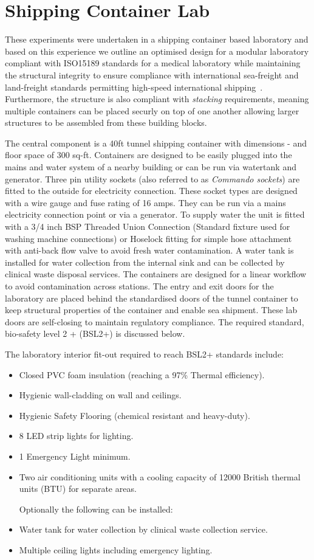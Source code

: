 \documentclass[a4paper,12pt]{article}
\begin{document}
\section{Shipping Container Lab}
These experiments were undertaken in a shipping container based laboratory and based on this experience we outline an optimised design for a modular laboratory compliant with ISO15189 standards for a medical laboratory while maintaining the structural integrity to ensure compliance with international sea-freight and land-freight standards permitting high-speed international shipping~\cite{}. Furthermore, the structure is also compliant with \emph{stacking} requirements, meaning multiple containers can be placed securly on top of one another allowing larger structures to be assembled from these building blocks.

 The central component is a 40ft tunnel shipping container with dimensions - and floor space of 300 sq-ft. Containers are designed to be easily plugged into the mains and water system of a nearby building or can be run via watertank and generator. Three pin utility sockets (also referred to as \emph{Commando sockets}) are fitted to the outside for electricity connection. These socket types are designed with a wire gauge and fuse rating of 16 amps. They can be run via a mains electricity connection point or via a generator. To supply water the unit is fitted with a 3/4 inch BSP Threaded Union Connection (Standard fixture used for washing machine connections) or Hoselock fitting for simple hose attachment with anti-back flow valve to avoid fresh water contamination. A water tank is installed for water collection from the internal sink and can be collected by clinical waste disposal services. The containers are designed for a linear workflow to avoid contamination across stations. The entry and exit doors for the laboratory are placed behind the standardised doors of the tunnel container to keep structural properties of the container and enable sea shipment. These lab doors are self-closing to maintain regulatory compliance. The required standard, bio-safety level 2 + (BSL2+) is discussed below.

The laboratory interior fit-out required to reach BSL2+ standards include:
\begin{itemize}
\item	Closed PVC foam insulation (reaching a 97\% Thermal efficiency).
\item	Hygienic wall-cladding on wall and ceilings.
\item 	Hygienic Safety Flooring (chemical resistant and heavy-duty).
\item 	8 LED strip lights for lighting.
\item	1 Emergency Light minimum.
\item	Two air conditioning units with a cooling capacity of 12000 British thermal units (BTU) for separate areas.

Optionally the following can be installed:
\item Water tank for water collection by clinical waste collection service.
\item Multiple ceiling lights including emergency lighting.
\end{itemize}
\end{document}
